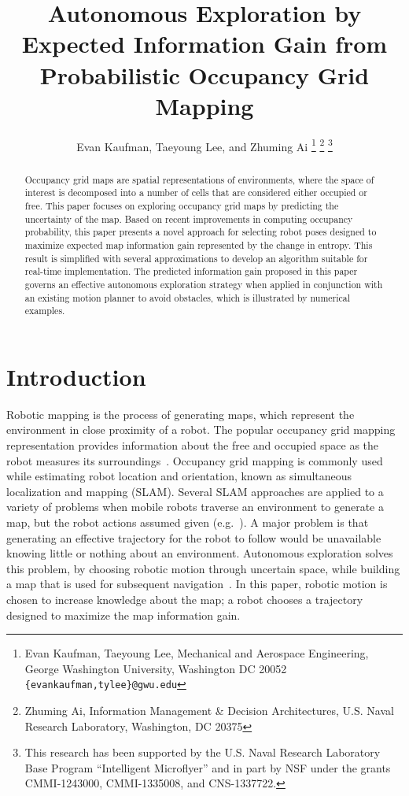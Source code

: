 \documentclass[letterpaper, 10pt, conference]{ieeeconf}
\title{\LARGE \bf
Autonomous Exploration by Expected Information Gain from Probabilistic Occupancy Grid Mapping
}
\author{Evan Kaufman, Taeyoung Lee, and Zhuming Ai%
\thanks{Evan Kaufman, Taeyoung Lee, Mechanical and Aerospace Engineering, George Washington University, Washington DC 20052 {\tt \{evankaufman,tylee\}@gwu.edu}}
\thanks{Zhuming Ai, Information Management \& Decision Architectures, U.S. Naval Research Laboratory,  Washington, DC 20375}
\thanks{This research has been supported by the U.S. Naval Research Laboratory Base Program ``Intelligent Microflyer'' and in part by NSF under the grants CMMI-1243000, CMMI-1335008, and CNS-1337722.}
}
\begin{document}
\maketitle
\thispagestyle{empty}
\pagestyle{empty}


\begin{abstract}
Occupancy grid maps are spatial representations of environments, where the space of interest is decomposed into a number of cells that are considered either occupied or free. This paper focuses on exploring occupancy grid maps by predicting the uncertainty of the map. Based on recent improvements in computing occupancy probability, this paper presents a novel approach for selecting robot poses designed to maximize expected map information gain represented by the change in entropy. This result is simplified with several approximations to develop an algorithm suitable for real-time implementation. The predicted information gain proposed in this paper governs an effective autonomous exploration strategy when applied in conjunction with an existing motion planner to avoid obstacles, which is illustrated by numerical examples.
\end{abstract}


\section{Introduction}

Robotic mapping is the process of generating maps, which represent the environment in close proximity of a robot. The popular occupancy grid mapping representation provides information about the free and occupied space as the robot measures its surroundings~\cite{ThrBurFox05}. Occupancy grid mapping is commonly used while estimating robot location and orientation, known as simultaneous localization and mapping (SLAM). Several SLAM approaches are applied to a variety of problems when mobile robots traverse an environment to generate a map, but the robot actions assumed given (e.g.~\cite{ThrBurFox05,DurBai06,CheChe09}). A major problem is that generating an effective trajectory for the robot to follow would be unavailable knowing little or nothing about an environment. 
Autonomous exploration solves this problem, by choosing robotic motion through uncertain space, while building a map that is used for subsequent navigation~\cite{Yam97}.
In this paper, robotic motion is chosen to increase knowledge about the map; a robot chooses a trajectory designed to maximize the map information gain. %
\end{document}
